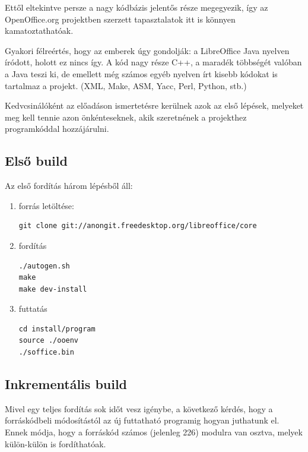 \documentclass[a4paper]{report}
\begin{document}
Ettől eltekintve persze a nagy kódbázis jelentős része megegyezik, így az
OpenOffice.org projektben szerzett tapasztalatok itt is könnyen
kamatoztathatóak.

Gyakori félreértés, hogy az emberek úgy gondolják: a LibreOffice Java nyelven
íródott, holott ez nincs így. A kód nagy része C++, a maradék többségét valóban
a Java teszi ki, de emellett még számos egyéb nyelven írt kisebb kódokat is
tartalmaz a projekt. (XML, Make, ASM, Yacc, Perl, Python, stb.)

Kedvcsinálóként az előadáson ismertetésre kerülnek azok az első lépések,
melyeket meg kell tennie azon önkénteseknek, akik szeretnének a projekthez
programkóddal hozzájárulni.

\subsection*{Első build}

Az első fordítás három lépésből áll:

\begin{enumerate}
\item forrás letöltése:

\begin{verbatim}
git clone git://anongit.freedesktop.org/libreoffice/core
\end{verbatim}

\item fordítás

\begin{verbatim}
./autogen.sh
make
make dev-install
\end{verbatim}

\item futtatás

\begin{verbatim}
cd install/program
source ./ooenv
./soffice.bin
\end{verbatim}

\end{enumerate}

\subsection*{Inkrementális build}

Mivel egy teljes fordítás sok időt vesz igénybe, a következő kérdés, hogy a
forráskódbeli módosítástól az új futtatható programig hogyan juthatunk el.
Ennek módja, hogy a forráskód számos (jelenleg 226) modulra van osztva, melyek
külön-külön is fordíthatóak.
\end{document}
